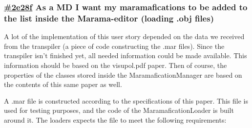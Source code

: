 \documentclass[10pt]{extarticle} %
\begin{document}
    \newcommand{\clickup}[1]{https://app.clickup.com/757520/761304/t/#1}

    \subsubsection{\href{\clickup{2e28f}}{\#2e28f} As a MD I want my maramafications to be added to the list inside the Marama-editor (loading .obj files)}
    A lot of the implementation of this user story depended on the data we received from the transpiler (a piece of code constructing the .mar files).
    Since the transpiler isn't finished yet, all needed information could be made available.
    This information should be based on the visupol.pdf\cite{visupol} paper.
    Then of course, the properties of the classes stored inside the MaramaficationManager are based on the contents of this same paper as well.

    A .mar file is constructed according to the specifications of this paper.
    This file is used for testing purposes, and the code of the MaramaficationLoader is built around it.
    The loaders expects the file to meet the following requirements:
\end{document}
